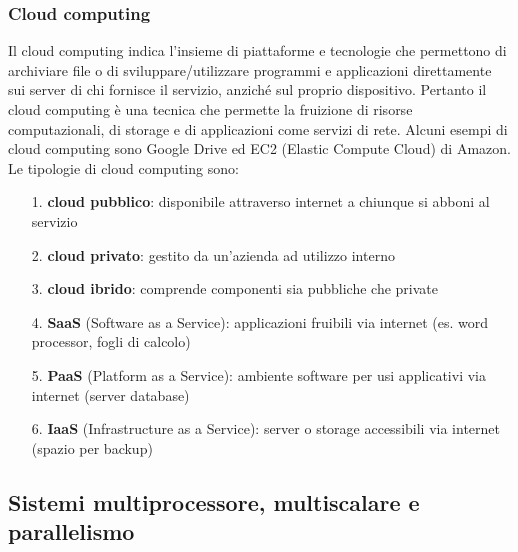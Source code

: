 \documentclass[a4paper]{article}
\begin{document}
\subsubsection*{Cloud computing}
Il cloud computing indica l'insieme di piattaforme e tecnologie che permettono di archiviare file o di sviluppare/utilizzare
programmi e applicazioni direttamente sui server di chi fornisce il servizio, anziché sul proprio dispositivo. Pertanto il cloud
computing è una tecnica che permette la fruizione di risorse computazionali, di storage e di applicazioni come servizi di rete.
Alcuni esempi di cloud computing sono Google Drive ed EC2 (Elastic Compute Cloud) di Amazon. Le tipologie di cloud computing sono:
\begin{itemize}
	\item[1.] \textbf{cloud pubblico}: disponibile attraverso internet a chiunque si abboni al servizio
	\item[2.] \textbf{cloud privato}: gestito da un’azienda ad utilizzo interno
	\item[3.] \textbf{cloud ibrido}: comprende componenti sia pubbliche che private
	\item[4.] \textbf{SaaS} (Software as a Service): applicazioni fruibili via internet (es. word processor, fogli di calcolo)
	\item[5.] \textbf{PaaS} (Platform as a Service): ambiente software per usi applicativi via internet (server database)
	\item[6.] \textbf{IaaS} (Infrastructure as a Service): server o storage accessibili via internet (spazio per backup)
\end{itemize}



\subsection{Sistemi multiprocessore, multiscalare e parallelismo}
\end{document}
